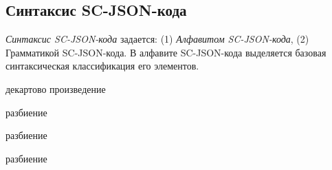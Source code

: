 \subsection{Синтаксис SC-JSON-кода}
\label{sec_soft_platform_sc_json_code_alphabet_and_syntax}

\textit{Синтаксис SC-JSON-кода} задается: (1) \textit{Алфавитом SC-JSON-кода}, (2) Грамматикой SC-JSON-кода. В алфавите SC-JSON-кода выделяется базовая синтаксическая классификация его элементов.

\begin{SCn}

\begin{scnsubstruct}
\begin{scnindent}
    \begin{scnindent}
        \begin{scnreltovector}{декартово произведение}
        \end{scnreltovector}
    \end{scnindent}
    \begin{scnrelfromset}{разбиение}
    \end{scnrelfromset}
\end{scnindent}

\begin{scnrelfromset}{разбиение}
    \begin{scnindent}
        \begin{scnrelfromset}{разбиение}
        \end{scnrelfromset}
    \end{scnindent}
\end{scnrelfromset}
\end{scnsubstruct}
\end{SCn}

